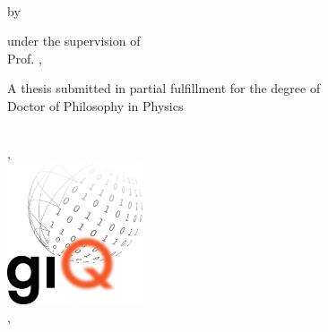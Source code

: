 
\begin{titlepage}
\begin{center}
    \vspace*{1cm}
    \myUniversity\\
    \vspace{1cm}
    {\Large \color{myColor}{\textbf{\myTitle}}}

    \vspace{0.25cm}

    {\large \color{myColor}{\mySubtitle}}

    \vspace{.5cm}
    by\\
    \textsc{\myName}
	\vspace{1 cm}

	under the supervision of \vspace{0.25cm}\\

	Prof. \textsc{\myProfessor,} \\

	\vspace{1 cm}

	A thesis submitted in partial fulfillment for the degree of \\
	Doctor of Philosophy in Physics
	\vspace{0.5cm}

    \myGroup \\
    \myDepartment, \myFaculty\\
    	\vspace{0.5cm}
    \includegraphics[width=4cm]{Figures/logos/giqlogo2.png}\\
    	\vspace{0.5cm}
	\myLocation, \myTime
\end{center}
\end{titlepage}
